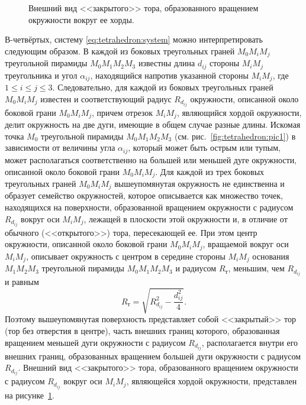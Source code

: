 \documentclass[../main.tex]{subfiles}
\begin{document}
\begin{figure}[htbp]
  \centering


  \caption{Внешний вид <<закрытого>> тора, образованного вращением окружности вокруг ее хорды.}
  \label{fig:tetrahedron:pic2}
\end{figure}

В-четвёртых, систему \eqref{eq:tetrahedron:system} можно интерпретировать следующим образом. В каждой из боковых треугольных граней $M_0 M_i M_j$ треугольной пирамиды $M_0 M_1 M_2 M_3$ известны длина $d_{ij}$ стороны $M_i M_j$ треугольника и угол $\alpha_{ij}$, находящийся напротив указанной стороны $M_i M_j$, где $1 \le i \le j \le 3$. Следовательно, для каждой из боковых треугольных граней $M_0 M_i M_j$ известен и соответствующий радиус $R_{d_{ij}}$ окружности, описанной около боковой грани $M_0 M_i M_j$, причем отрезок $M_i M_j$, являющийся хордой окружности, делит окружность на две дуги, имеющие в общем случае разные длины. Искомая точка $M_0$ треугольной пирамиды $M_0 M_1 M_2 M_3$ (см. рис.~\ref{fig:tetrahedron:pic1}) в зависимости от величины угла $\alpha_{ij}$, который может быть острым или тупым, может располагаться соответственно на большей или меньшей дуге окружности, описанной около боковой грани $M_0 M_i M_j$. Для каждой из трех боковых треугольных граней $M_0 M_i M_j$ вышеупомянутая окружность не единственна и образует семейство окружностей, которое описывается как множество точек, находящихся на поверхности, образованной вращением окружности с радиусом $R_{d_{ij}}$ вокруг оси $M_i M_j$, лежащей в плоскости этой окружности и, в отличие от обычного (<<открытого>>) тора, пересекающей ее. При этом центр окружности, описанной около боковой грани $M_0 M_i M_j$, вращаемой вокруг оси $M_i M_j$, описывает окружность с центром в середине стороны $M_i M_j$ основания $M_1 M_2 M_3$ треугольной пирамиды $M_0 M_1 M_2 M_3$ и радиусом $R_{\text{т}}$, меньшим, чем $R_{d_{ij}}$ и равным
\begin{equation*}
  R_{\text{т}} = \sqrt{R_{d_{ij}}^2 - \frac{d_{ij}^2}{4}}.
\end{equation*}
Поэтому вышеупомянутая поверхность представляет собой <<закрытый>> тор (тор без отверстия в центре), часть внешних границ которого, образованная вращением меньшей дуги окружности с радиусом $R_{d_{ij}}$, располагается внутри его внешних границ, образованных вращением большей дуги окружности с радиусом $R_{d_{ij}}$. Внешний вид <<закрытого>> тора, образованного вращением окружности с радиусом $R_{d_{ij}}$ вокруг оси $M_i M_j$, являющейся хордой окружности, представлен на рисунке~\ref{fig:tetrahedron:pic2}.
\end{document}
